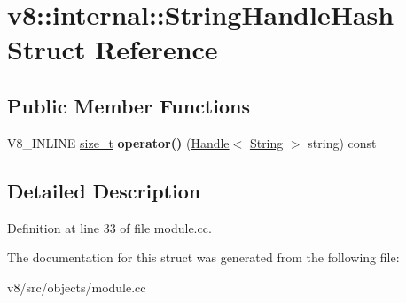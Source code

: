 \hypertarget{structv8_1_1internal_1_1StringHandleHash}{}\section{v8\+:\+:internal\+:\+:String\+Handle\+Hash Struct Reference}
\label{structv8_1_1internal_1_1StringHandleHash}
\subsection*{Public Member Functions}
\begin{DoxyCompactItemize}
\item 
\mbox{\label{structv8_1_1internal_1_1StringHandleHash_ab4ba629c5ee212cd13a83093173ce334}} 
V8\+\_\+\+I\+N\+L\+I\+NE \mbox{\hyperlink{classsize__t}{size\+\_\+t}} {\bfseries operator()} (\mbox{\hyperlink{classv8_1_1internal_1_1Handle}{Handle}}$<$ \mbox{\hyperlink{classv8_1_1internal_1_1String}{String}} $>$ string) const
\end{DoxyCompactItemize}


\subsection{Detailed Description}


Definition at line 33 of file module.\+cc.



The documentation for this struct was generated from the following file\+:\begin{DoxyCompactItemize}
\item 
v8/src/objects/module.\+cc\end{DoxyCompactItemize}
